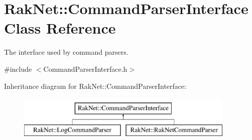 \hypertarget{class_rak_net_1_1_command_parser_interface}{\section{Rak\-Net\-:\-:Command\-Parser\-Interface Class Reference}
\label{class_rak_net_1_1_command_parser_interface}
}


The interface used by command parsers.  




{\ttfamily \#include $<$Command\-Parser\-Interface.\-h$>$}

Inheritance diagram for Rak\-Net\-:\-:Command\-Parser\-Interface\-:\begin{figure}[H]
\begin{center}
\leavevmode
\includegraphics[height=2.000000cm]{class_rak_net_1_1_command_parser_interface}
\end{center}
\end{figure}
